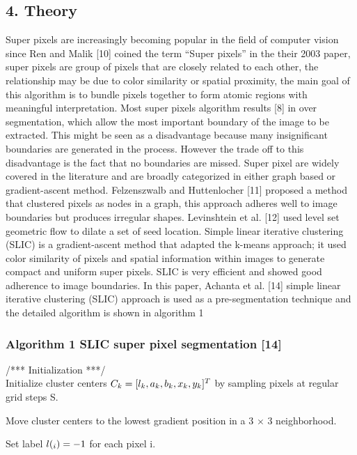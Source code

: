 \documentclass{article}
\begin{document}
\subsection*{4. Theory}
{\normalsize Super pixels are increasingly becoming popular in the field of computer vision since Ren and Malik [10]  coined the term “Super pixels” in the their 2003 paper, super pixels are group of pixels that are closely related to each other, the relationship may be due to color similarity or spatial proximity, the main goal of this algorithm is to bundle pixels together to form atomic regions with meaningful interpretation. Most super pixels algorithm results [8] in over segmentation, which allow the most important boundary of the image to be extracted. This might be seen as a disadvantage because many insignificant boundaries are generated in the process. However the trade off to this disadvantage is the fact that no boundaries are missed.
Super pixel are widely covered in the literature and are broadly categorized in either graph based or gradient-ascent method.  Felzenszwalb and Huttenlocher [11] proposed a method that clustered pixels as nodes in a graph, this approach adheres well to image boundaries but produces irregular shapes. Levinshtein et al. [12] used level set geometric flow to dilate a set of seed location. Simple linear iterative clustering (SLIC) is a gradient-ascent method that adapted the k-means approach; it used color similarity of pixels and spatial information within images to generate compact and uniform super pixels. SLIC is very efficient and showed good adherence to image boundaries. In this paper, Achanta et al. [14] simple linear iterative clustering (SLIC) approach is used as a pre-segmentation technique and the detailed algorithm is shown in algorithm 1

\subsubsection*{Algorithm 1 SLIC super pixel segmentation [14]}

\begin{flushleft}
	/*** Initialization ***/ \\
	Initialize cluster centers ${\large C}_{k} = [{\large }l_{k}, {\large }a_{k},{\large }b_{k},{\large }x_{k},{\large }y_{k}]^{T}$ by sampling pixels at regular grid steps S.
	
	Move cluster centers to the lowest gradient position in a  3 $\times$ 3  neighborhood.
	
	Set label $ {\large }l (_{i}) = -1 $ for each pixel i.
	

\end{flushleft}}
\end{document}
